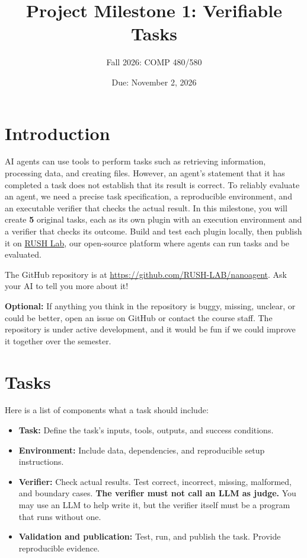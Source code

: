 \documentclass{article}
\title{Project Milestone 1: Verifiable Tasks}
\author{Fall 2026: COMP 480/580}
\date{Due: November 2, 2026}
\begin{document}
\maketitle

\section{Introduction}

AI agents can use tools to perform tasks such as retrieving information, processing data, and creating files. However, an agent's statement that it has completed a task does not establish that its result is correct. To reliably evaluate an agent, we need a precise task specification, a reproducible environment, and an executable verifier that checks the actual result. In this milestone, you will create \textbf{5} original tasks, each as its own plugin with an execution environment and a verifier that checks its outcome. Build and test each plugin locally, then publish it on \href{https://rush-lab.org}{RUSH Lab}, our open-source platform where agents can run tasks and be evaluated. 

The GitHub repository is at \url{https://github.com/RUSH-LAB/nanoagent}. Ask your AI to tell you more about it! 

\textbf{Optional:} If anything you think in the repository is buggy, missing, unclear, or could be better, open an issue on GitHub or contact the course staff. The repository is under active development, and it would be fun if we could improve it together over the semester.

\section{Tasks}

Here is a list of components what a task should include:

\begin{itemize}
    \item \textbf{Task:} Define the task's inputs, tools, outputs, and success conditions.
    \item \textbf{Environment:} Include data, dependencies, and reproducible setup instructions.
    \item \textbf{Verifier:} Check actual results. Test correct, incorrect, missing, malformed, and boundary cases. \textbf{The verifier must not call an LLM as judge.} You may use an LLM to help write it, but the verifier itself must be a program that runs without one.
    \item \textbf{Validation and publication:} Test, run, and publish the task. Provide reproducible evidence.
\end{itemize}
\end{document}
